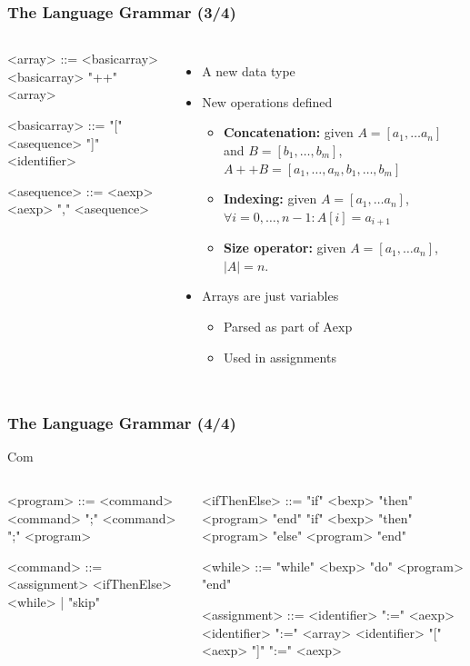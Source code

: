 \documentclass{beamer}
\begin{document}
\begin{frame}[fragile]
	\footnotesize
	\frametitle{The Language Grammar (3/4)}
	\begin{columns}
		\begin{grammar}
			<array> ::= <basicarray>
			\alt <basicarray> "++" <array>

			<basicarray> ::= "[" <asequence> "]"
			\alt <identifier>

			<asequence> ::= <aexp>
			\alt <aexp> "," <asequence>
		\end{grammar}

		\column{0.63\textwidth}
		\begin{itemize}
			\item A new data type
			\item New operations defined
				\begin{itemize}
					\footnotesize
					\item \textbf{Concatenation:} given $A=\left[ a_1,\ldots a_n\right]$
						and $B = \left[ b_1,\ldots, b_m\right]$,
						$A++B=\left[a_1,\ldots, a_n, b_1, \ldots, b_m\right]$
					\item \textbf{Indexing:} given $A=\left[ a_1,\ldots a_n\right]$,
						$\forall i = 0,\ldots, n-1: A[i] = a_{i+1}$
					\item \textbf{Size operator:} given $A=\left[ a_1,\ldots a_n\right]$,
						$|A|=n$.
				\end{itemize}
			\item Arrays are just variables
				\begin{itemize}
					\footnotesize
					\item Parsed as part of $\mathrm{Aexp}$
					\item Used in assignments
				\end{itemize}
		\end{itemize}
	\end{columns}
\end{frame}

\begin{frame}[fragile]
\footnotesize
\frametitle{The Language Grammar (4/4)}
\begin{block}{Com}
\begin{columns}
\begin{grammar}
	<program> ::= <command>
	\alt <command> ";"
	\alt <command> ";" <program>

	<command> ::= <assignment>
	\alt <ifThenElse>
	\alt <while> | "skip"

\end{grammar}
\begin{grammar}
	<ifThenElse> ::= "if" <bexp> "then" <program> "end"
	\alt "if" <bexp> "then" <program> "else" <program> "end"

	<while> ::= "while" <bexp> "do" <program> "end"

	<assignment> ::= <identifier> ":=" <aexp>
	\alt <identifier> ":=" <array>
	\alt <identifier> "[" <aexp> "]" ":=" <aexp>
\end{grammar}
\end{columns}
\end{block}
\end{frame}
\end{document}
